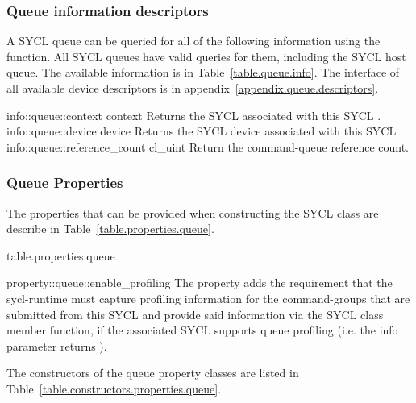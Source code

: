 \subsubsection{Queue information descriptors}

A SYCL \gls{queue} can be queried for all of the following information using the
 function. All SYCL queues have valid queries for them,
including the SYCL host queue. The available information is in
Table~\ref{table.queue.info}. The interface of all available device descriptors is
in appendix~\ref{appendix.queue.descriptors}.

\addInfoRow
{info::queue::context}
{context}
{
  Returns the SYCL  associated with this SYCL .
}
\addInfoRow
{info::queue::device}
{device}
{
  Returns the SYCL \gls{device} associated with this SYCL .
}
\addInfoRow
{info::queue::reference_count}
{cl_uint}
{Return the command-queue reference count.}
\completeTable

\subsubsection{Queue Properties}
\label{sec:queue-properties}

The properties that can be provided when constructing the SYCL
 class are describe in
Table~\ref{table.properties.queue}.

 {table.properties.queue}

\addRow
  { property::queue::enable_profiling }
  {
    The  property adds the requirement
    that the \gls{sycl-runtime} must capture profiling information for
    the \glspl{command-group} that are submitted from this SYCL
     and provide said information via the SYCL
     class  member
    function, if the associated SYCL  supports
    queue profiling (i.e. the  info parameter returns ).
  }
\completeTable

The constructors of the queue property classes are listed in Table~\ref{table.constructors.properties.queue}.

